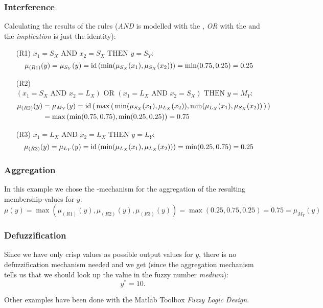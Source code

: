 \subsubsection*{Interference}
Calculating the results of the rules (\textit{AND} is modelled with the , \textit{OR} with the  and the \textit{implication} is just the identity):
\begin{enumerate}
\item[(R1)] $x_1=S_X \text{ AND } x_2=S_X \text{ THEN } y=S_Y$:\\
	\[ \mu_{(R1)}(y) = \mu_{S_Y}(y) = \operatorname{id}\left( \min(\mu_{S_X}(x_1), \mu_{S_X}(x_2) ) \right) = \min(0.75, 0.25) = 0.25 \]
\item[(R2)] $(x_1=S_X \text{ AND } x_2=L_X) \text{ OR } (x_1=L_X \text{ AND } x_2=S_X) \text{ THEN } y=M_Y$:
	\begin{align*}
		\mu_{(R2)}(y) &= \mu_{M_Y}(y) = \operatorname{id}\left(\, \max\left(\, \min(\mu_{S_X}(x_1), \mu_{L_X}(x_2) ), \min(\mu_{L_X}(x_1), \mu_{S_X}(x_2) ) \,\right) \,\right) \\
		&= \max\left( \min(0.75, 0.75), \min(0.25,0.25) \right) = 0.75
	\end{align*}
\item[(R3)] $x_1=L_X \text{ AND } x_2=L_X \text{ THEN } y=L_Y$:\\
	\[ \mu_{(R3)}(y) = \mu_{L_Y}(y) = \operatorname{id}\left( \min(\mu_{L_X}(x_1), \mu_{L_X}(x_2) ) \right) = \min(0.25, 0.75) = 0.25 \]
\end{enumerate}

\subsubsection*{Aggregation}
In this example we chose the -mechanism for the aggregation of the resulting membership-values for $y$:
\[ \mu(y)= \max\left( \mu_{(R1)}(y), \mu_{(R2)}(y), \mu_{(R3)}(y) \right) = \max(0.25, 0.75, 0.25) = 0.75 = \mu_{M_Y}(y) \]

\subsubsection*{Defuzzification}
Since we have only crisp values as possible output values for $y$, there is no defuzzification mechanism needed and we get (since the aggregation mechanism tells us that we should look up the value in the fuzzy number \textit{medium}):
\[ y^{\ast} = 10. \]

Other examples have been done with the Matlab Toolbox \emph{Fuzzy Logic Design}.




